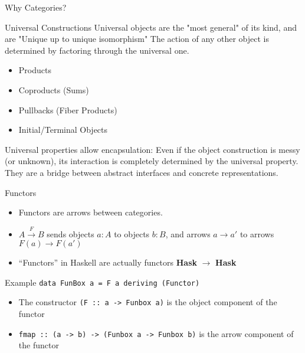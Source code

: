 \documentclass{beamer}
\begin{document}
\begin{frame}[plain,c]
\begin{center}
\Huge Why Categories?
\end{center}
\end{frame}

\begin{frame}{Universal Constructions}
Universal objects are the "most general" of its kind, and are "Unique up to unique isomorphism"
The action of any other object is determined by factoring through the universal one.
\pause
\begin{example}
\begin{itemize}
\item Products
\pause
\item Coproducts (Sums)
\pause
\item Pullbacks (Fiber Products)
\pause
\item Initial/Terminal Objects
\end{itemize}
\end{example}
\pause
Universal properties allow \alert{encapsulation}: Even if the object construction is messy (or unknown), its interaction is completely determined by the universal property.
They are a \alert{bridge} between abstract interfaces and concrete representations.
\end{frame}

\begin{frame}{Functors}
\begin{itemize}
\item Functors are arrows between categories.
\item $A \xrightarrow{F} B$ sends objects $a : A$ to objects $b : B$, and arrows $a\to a'$ to arrows $F(a) \to F(a')$
\item ``Functors'' in Haskell are actually functors {\bf Hask} $\to$ {\bf Hask}
\end{itemize}
\pause
\begin{block}{Example}
 \lstinline+data FunBox a = F a deriving (Functor)+
\begin{itemize}
\item The constructor \lstinline+(F :: a -> Funbox a)+ is the object component of the functor
\item \lstinline+fmap :: (a -> b) -> (Funbox a -> Funbox b)+ is the arrow component of the functor
\end{itemize}
\end{block}
\end{frame}
\end{document}
